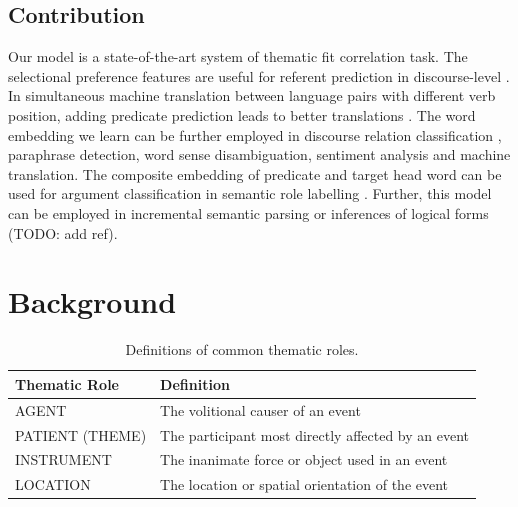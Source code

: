 \documentclass[a4paper]{article}
\begin{document}
\subsection{Contribution}
Our model is a state-of-the-art system of thematic fit correlation task. The selectional preference features are useful for referent prediction in discourse-level \citep{modi2017modeling}. In simultaneous machine translation between language pairs with different verb position, adding predicate prediction leads to better translations \citep{grissom2014don}. The word embedding we learn can be further employed in discourse relation classification \citep{shi2017need, rutherford2017systematic}, paraphrase detection, word sense disambiguation, sentiment analysis and machine translation. The composite embedding of predicate and target head word can be used for argument classification in semantic role labelling \citep{roth2016neural}. Further, this model can be employed in incremental semantic parsing \citep{konstas2014incremental, konstas2015semantic} or inferences of logical forms (TODO: add ref). 



\newpage
\section{Background}


\begin{table}[t]
\centering
\begin{tabular}{l|l}
\textbf{Thematic Role}  &   \textbf{Definition} \\ \hline
AGENT                   &   The volitional causer of an event \\
PATIENT (THEME)         &   The participant most directly affected by an event \\
INSTRUMENT              &   The inanimate force or object used in an event \\
LOCATION                &   The location or spatial orientation of the event \\
\end{tabular}
\caption{\label{tab:thematic} Definitions of common thematic roles.}
\end{table}
\end{document}
